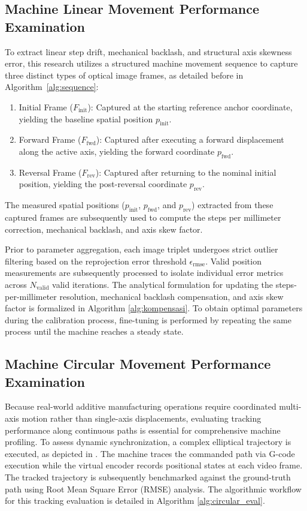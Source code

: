 \subsection{Machine Linear Movement Performance Examination}
To extract linear step drift, mechanical backlash, and structural axis skewness error, this research utilizes a structured machine movement sequence to capture three distinct types of optical image frames, as detailed before in Algorithm~\ref{alg:sequence}:
\begin{enumerate}
    \item Initial Frame ($F_{\text{init}}$): Captured at the starting reference anchor coordinate, yielding the baseline spatial position $p_{\text{init}}$.
    \item Forward Frame ($F_{\text{fwd}}$): Captured after executing a forward displacement along the active axis, yielding the forward coordinate $p_{\text{fwd}}$.
    \item Reversal Frame ($F_{\text{rev}}$): Captured after returning to the nominal initial position, yielding the post-reversal coordinate $p_{\text{rev}}$.
\end{enumerate}
The measured spatial positions ($p_{\text{init}}$, $p_{\text{fwd}}$, and $p_{\text{rev}}$) extracted from these captured frames are subsequently used to compute the steps per millimeter correction, mechanical backlash, and axis skew factor. 

Prior to parameter aggregation, each image triplet undergoes strict outlier filtering based on the reprojection error threshold $\epsilon_{\text{rmse}}$. Valid position measurements are subsequently processed to isolate individual error metrics across $N_{\text{valid}}$ valid iterations. The analytical formulation for updating the steps-per-millimeter resolution, mechanical backlash compensation, and axis skew factor is formalized in Algorithm \ref{alg:kompensasi}. To obtain optimal parameters during the calibration process, fine-tuning is performed by repeating the same process until the machine reaches a steady state.

\subsection{Machine Circular Movement Performance Examination}
Because real-world additive manufacturing operations require coordinated multi-axis motion rather than single-axis displacements, evaluating tracking performance along continuous paths is essential for comprehensive machine profiling. To assess dynamic synchronization, a complex elliptical trajectory is executed, as depicted in . The machine traces the commanded path via G-code execution while the virtual encoder records positional states at each video frame. The tracked trajectory is subsequently benchmarked against the ground-truth path using Root Mean Square Error (RMSE) analysis. The algorithmic workflow for this tracking evaluation is detailed in Algorithm \ref{alg:circular_eval}.

